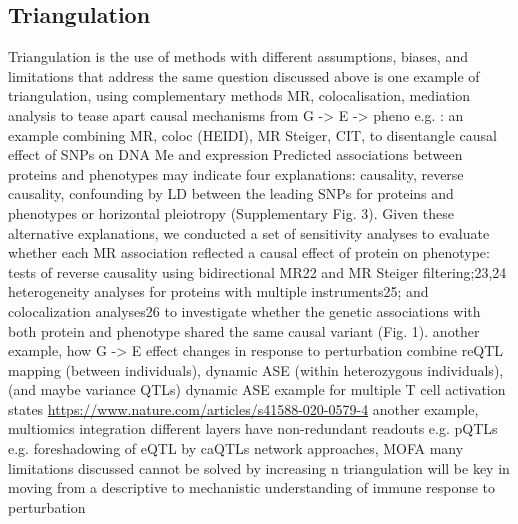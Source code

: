 \begin{outline}
\subsection{Triangulation}

\1 Triangulation is the use of methods with different assumptions, biases, and limitations that address the same question \autocite{munafo2018RobustResearchNeeds}
    \2 discussed above is one example of triangulation, using complementary methods MR, colocalisation, mediation analysis to tease apart causal mechanisms from G -> E -> pheno
        \3 e.g. \textcite{taylor2019IntegrativeAnalysisGene}: an example combining MR, coloc (HEIDI), MR Steiger, CIT, to disentangle causal effect of SNPs on DNA Me and expression
        \3 \autocite{zheng2019PhenomewideMendelianRandomization} Predicted associations between proteins and phenotypes may indicate four explanations: causality, reverse causality, confounding by LD between the leading SNPs for proteins and phenotypes or horizontal pleiotropy (Supplementary Fig. 3). Given these alternative explanations, we conducted a set of sensitivity analyses to evaluate whether each MR association reflected a causal effect of protein on phenotype: tests of reverse causality using bidirectional MR22 and MR Steiger filtering;23,24 heterogeneity analyses for proteins with multiple instruments25; and colocalization analyses26 to investigate whether the genetic associations with both protein and phenotype shared the same causal variant (Fig. 1). 
    \2 another example, how G -> E effect changes in response to perturbation
        \3 combine reQTL mapping (between individuals), dynamic ASE (within heterozygous individuals), (and maybe variance QTLs)
        \3 dynamic ASE example for multiple T cell activation states \url{https://www.nature.com/articles/s41588-020-0579-4}
    \1 another example, multiomics integration
        \2 different layers have non-redundant readouts
        \2 e.g. pQTLs
        \2 e.g. foreshadowing of eQTL by caQTLs 
        \2 network approaches, MOFA
\1 many limitations discussed cannot be solved by increasing n
\1 triangulation will be key in moving from a descriptive to mechanistic understanding of immune response to perturbation

\end{outline}

